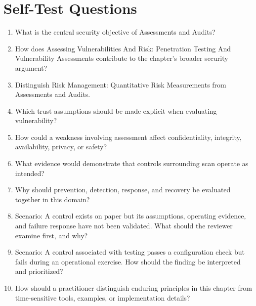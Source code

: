 \documentclass[11pt]{article}
\begin{document}
\section*{Self-Test Questions}
\begin{enumerate}
\item What is the central security objective of Assessments and Audits?
\item How does Assessing Vulnerabilities And Risk: Penetration Testing And Vulnerability Assessments contribute to the chapter's broader security argument?
\item Distinguish Risk Management: Quantitative Risk Measurements from Assessments and Audits.
\item Which trust assumptions should be made explicit when evaluating vulnerability?
\item How could a weakness involving assessment affect confidentiality, integrity, availability, privacy, or safety?
\item What evidence would demonstrate that controls surrounding scan operate as intended?
\item Why should prevention, detection, response, and recovery be evaluated together in this domain?
\item Scenario: A control exists on paper but its assumptions, operating evidence, and failure response have not been validated. What should the reviewer examine first, and why?
\item Scenario: A control associated with testing passes a configuration check but fails during an operational exercise. How should the finding be interpreted and prioritized?
\item How should a practitioner distinguish enduring principles in this chapter from time-sensitive tools, examples, or implementation details?
\end{enumerate}
\end{document}
